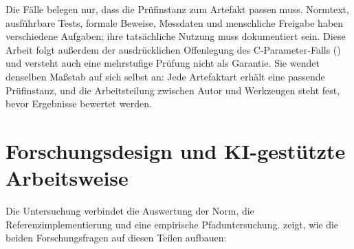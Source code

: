 Die Fälle belegen nur, dass die Prüfinstanz zum Artefakt passen muss. Normtext, ausführbare Tests, formale
Beweise, Messdaten und menschliche Freigabe haben verschiedene Aufgaben; ihre tatsächliche Nutzung muss
dokumentiert sein. Diese Arbeit folgt außerdem der ausdrücklichen Offenlegung des C-Parameter-Falls
() und versteht auch eine mehrstufige Prüfung nicht als Garantie. Sie wendet
denselben Maßstab auf sich selbst an: Jede Artefaktart erhält eine passende Prüfinstanz, und die
Arbeitsteilung zwischen Autor und Werkzeugen steht fest, bevor Ergebnisse bewertet werden.

\section{Forschungsdesign und KI-gestützte Arbeitsweise}
\label{sec:forschungsdesign}
\label{sec:rfc-auswertung}

Die Untersuchung verbindet die Auswertung der Norm, die Referenzimplementierung und eine empirische
Pfaduntersuchung.  zeigt, wie die beiden Forschungsfragen auf diesen Teilen
aufbauen:

